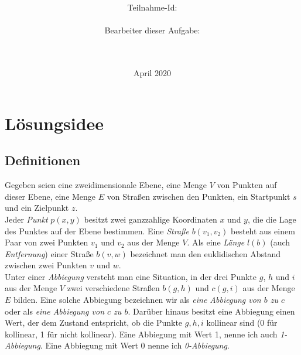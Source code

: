 \documentclass[a4paper,10pt,ngerman]{scrartcl}
\title{\textbf{\Huge\Aufgabe}}
\author{\LARGE Teilnahme-Id: \LARGE \TeilnahmeId \\\\
	    \LARGE Bearbeiter dieser Aufgabe: \\ 
	    \LARGE \Namen\\\\}
\date{\LARGE April 2020}
\begin{document}
\maketitle
\tableofcontents

\vspace{0.5cm}

\newpage
\section{Lösungsidee}
\subsection{Definitionen}

\indent Gegeben seien eine zweidimensionale Ebene, eine Menge $V$ von Punkten auf dieser Ebene, eine Menge $E$ von Straßen zwischen den Punkten, ein Startpunkt $s$ und ein Zielpunkt $z$. \\

Jeder \textit{Punkt} $p(x,y)$ besitzt zwei ganzzahlige Koordinaten $x$ und $y$, die die Lage des Punktes auf der Ebene bestimmen.
Eine \textit{Straße} $b(v_1, v_2)$ besteht aus einem Paar von zwei Punkten $v_1$ und $v_2$ aus der Menge $V$.
Als eine \textit{Länge} $l(b)$ (auch \textit{Entfernung}) einer Straße $b(v, w)$ bezeichnet man den euklidischen Abstand zwischen zwei Punkten $v$ und $w$.\\
Unter einer \textit{Abbiegung} versteht man eine Situation, in der drei Punkte $g$, $h$ und $i$ aus der Menge $V$ zwei
verschiedene Straßen $b(g, h)$ und $c(g, i)$ aus der Menge $E$ bilden. 
Eine solche Abbiegung bezeichnen wir als \textit{eine Abbiegung von $b$ zu $c$}
oder als \textit{eine Abbiegung von $c$ zu $b$}. Darüber hinaus besitzt eine Abbiegung einen Wert,
der dem Zustand entspricht, ob die Punkte $g, h, i$ kollinear sind (0 für kollinear, 1 für nicht kollinear).
Eine Abbiegung mit Wert 1, nenne ich auch \textit{1-Abbiegung}. Eine Abbiegung mit Wert 0 nenne ich \textit{0-Abbiegung}.\\
\end{document}
